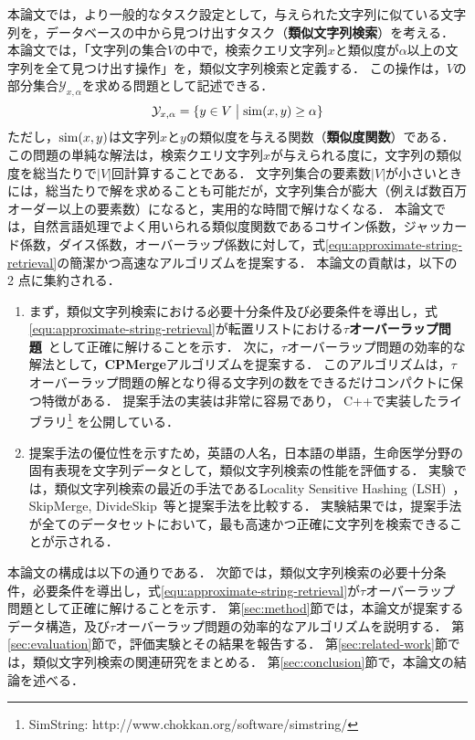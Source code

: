 \documentclass[japanese]{jnlp_JS2.0}
\begin{document}
本論文では，より一般的なタスク設定として，与えられた文字列に似ている文字列を，データベースの中から見つけ出すタスク（{\bf 類似文字列検索}）を考える．
本論文では，「文字列の集合$V$の中で，検索クエリ文字列$x$と類似度が$\alpha$以上の文字列を全て見つけ出す操作」を，類似文字列検索と定義する．
この操作は，$V$の部分集合$\mathcal{Y}_{x, \alpha}$を求める問題として記述できる．
\begin{equation}
 \mathcal{Y}_{x, \alpha} = \{y \in V \bigm| {\rm sim}(x, y) \geq \alpha \}
 \label{equ:approximate-string-retrieval}
\end{equation}
ただし，${\rm sim}(x, y)$は文字列$x$と$y$の類似度を与える関数（{\bf 類似度関数}）である．
この問題の単純な解法は，検索クエリ文字列$x$が与えられる度に，文字列の類似度を総当たりで$|V|$回計算することである．
文字列集合の要素数$|V|$が小さいときには，総当たりで解を求めることも可能だが，文字列集合が膨大（例えば数百万オーダー以上の要素数）になると，実用的な時間で解けなくなる．
本論文では，自然言語処理でよく用いられる類似度関数であるコサイン係数，ジャッカード係数，ダイス係数，オーバーラップ係数に対して，式\ref{equ:approximate-string-retrieval}の簡潔かつ高速なアルゴリズムを提案する．
本論文の貢献は，以下の 2 点に集約される．
\begin{enumerate}
\item まず，類似文字列検索における必要十分条件及び必要条件を導出し，式\ref{equ:approximate-string-retrieval}が転置リストにおける{\bf $\tau$オーバーラップ問題}~\cite{Sarawagi:04}として正確に解けることを示す．
次に，$\tau$オーバーラップ問題の効率的な解法として，{\bf CPMerge}アルゴリズムを提案する．
このアルゴリズムは，$\tau$オーバーラップ問題の解となり得る文字列の数をできるだけコンパクトに保つ特徴がある．
提案手法の実装は非常に容易であり，
C++で実装したライブラリ\footnote{SimString: http://www.chokkan.org/software/simstring/}
を公開している．

\item 提案手法の優位性を示すため，英語の人名，日本語の単語，生命医学分野の固有表現を文字列データとして，類似文字列検索の性能を評価する．
実験では，類似文字列検索の最近の手法であるLocality Sensitive Hashing (LSH)~\cite{Andoni:08}，SkipMerge, DivideSkip~\cite{Li:08}等と提案手法を比較する．
実験結果では，提案手法が全てのデータセットにおいて，最も高速かつ正確に文字列を検索できることが示される．
\end{enumerate}

本論文の構成は以下の通りである．
次節では，類似文字列検索の必要十分条件，必要条件を導出し，式\ref{equ:approximate-string-retrieval}が$\tau$オーバーラップ問題として正確に解けることを示す．
第\ref{sec:method}節では，本論文が提案するデータ構造，及び$\tau$オーバーラップ問題の効率的なアルゴリズムを説明する．
第\ref{sec:evaluation}節で，評価実験とその結果を報告する．
第\ref{sec:related-work}節では，類似文字列検索の関連研究をまとめる．
第\ref{sec:conclusion}節で，本論文の結論を述べる．
\end{document}

